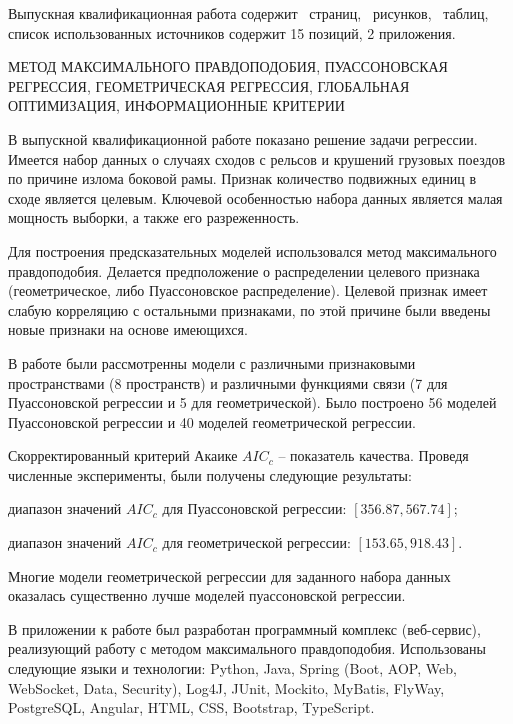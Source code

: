 Выпускная квалификационная работа содержит \pageref{LastPage}~страниц, \totfig~рисунков, \tottab~таблиц, список использованных источников содержит 15 позиций, 2 приложения.



\noindent
МЕТОД МАКСИМАЛЬНОГО ПРАВДОПОДОБИЯ, ПУАССОНОВСКАЯ РЕГРЕССИЯ, ГЕОМЕТРИЧЕСКАЯ РЕГРЕССИЯ, ГЛОБАЛЬНАЯ ОПТИМИЗАЦИЯ, ИНФОРМАЦИОННЫЕ КРИТЕРИИ




В выпускной квалификационной работе показано решение задачи регрессии. Имеется набор данных о случаях сходов с рельсов и крушений грузовых поездов по причине излома боковой рамы. Признак количество подвижных единиц в сходе является целевым. Ключевой особенностью набора данных является малая мощность выборки, а также его разреженность.

Для построения предсказательных моделей использовался метод максимального правдоподобия. Делается предположение о распределении целевого признака (геометрическое, либо Пуассоновское распределение). Целевой признак имеет слабую корреляцию с остальными признаками, по этой причине были введены новые признаки на основе имеющихся.

В работе были рассмотренны модели с различными признаковыми пространствами (8 пространств) и различными функциями связи (7 для Пуассоновской регрессии и 5 для геометрической). Было построено 56 моделей Пуассоновской регрессии и 40 моделей геометрической регрессии.

Скорректированный критерий Акаике $AIC_c$ -- показатель качества. Проведя численные эксперименты, были получены следующие результаты:
\begin{description}[font=$\bullet$]
    \item диапазон значений $AIC_c$ для Пуассоновской регрессии:  $[356.87, 567.74]$;
    \item диапазон значений $AIC_c$ для геометрической регрессии: $[153.65, 918.43]$.
\end{description}
Многие модели геометрической регрессии для заданного набора данных оказалась существенно лучше моделей пуассоновской регрессии.


В приложении к работе был разработан программный комплекс (веб-сервис), реализующий работу с методом максимального правдоподобия. Использованы следующие языки и технологии: Python, Java, Spring (Boot, AOP, Web, WebSocket, Data, Security), Log4J, JUnit, Mockito, MyBatis, FlyWay, PostgreSQL, Angular, HTML, CSS, Bootstrap, TypeScript.




